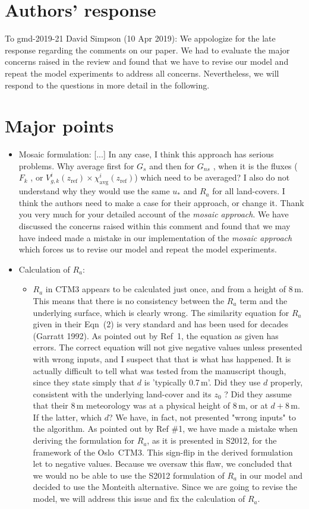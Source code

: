 \documentclass{scrartcl}
\begin{document}
\section*{Authors' response}
To gmd-2019-21 David Simpson (10 Apr 2019):
We appologize for the late response regarding the comments on our paper. We had to evaluate the major concerns raised in the review and found that we have to revise our model and repeat the model experiments to address all concerns. Nevertheless, we will respond to the questions in more detail in the following.

\section{Major points}
\begin{itemize}
\item {\color{blue} Mosaic formulation: [...] In any case, I think this approach has serious problems. Why average first for $G_s$ and then for $G_{ns}$ , when it is the fluxes ($F_k$ , or $V^i_{g,k}(z_\mathrm{ref}) \times \chi^i_\mathrm{avg}(z_\mathrm{ref})$) which need to be averaged? I also do not understand why they would use the same $u_*$ and $R_a$ for all land-covers. I think the authors need to make a case for their approach, or change it.}
  Thank you very much for your detailed account of the \emph{mosaic approach}. We have discussed the concerns raised within this comment and found that we may have indeed made a mistake in our implementation of the \emph{mosaic approach} which forces us to revise our model and repeat the model experiments.
\item {\color{blue} Calculation of $R_a$:}
  \begin{itemize}
  \item {\color{blue} $R_a$ in CTM3 appears to be calculated just once, and from a height of 8\,m. This means
that there is no consistency between the $R_a$ term and the underlying surface, which is
clearly wrong. The similarity equation for $R_a$ given in their Eqn~(2) is very standard and has been
used for decades (Garratt 1992). As pointed out by Ref~1, the equation as given has
errors. The correct equation will not give negative values unless presented with wrong
inputs, and I suspect that that is what has happened. It is actually difficult to tell what
was tested from the manuscript though, since they state simply that $d$ is ’typically 0.7\,m’.
Did they use $d$ properly, consistent with the underlying land-cover and its $z_0$ ? Did
they assume that their 8\,m meteorology was at a physical height of 8\,m, or at $d + 8\,\mathrm{m}$.
If the latter, which $d$?}
    We have, in fact, not presented "wrong inputs" to the algorithm.
    As pointed out by Ref \#1, we have made a mistake when deriving the formulation for $R_a$, as it is presented in S2012, for the framework of the Oslo~CTM3. This sign-flip in the derived formulation let to negative values. Because we oversaw this flaw, we concluded that we would no be able to use the S2012 formulation of $R_a$ in our model and decided to use the Monteith alternative.
    Since we are going to revise the model, we will address this issue and fix the calculation of $R_a$. 


\end{itemize}
\end{itemize}
\end{document}
